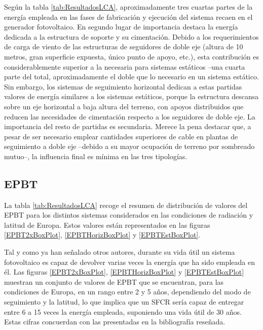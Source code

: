Según la tabla \ref{tab:ResultadosLCA}, aproximadamente tres cuartas
partes de la energía empleada en las fases de fabricación y ejecución
del sistema recaen en el generador fotovoltaico. En segundo lugar
de importancia destaca la energía dedicada a la estructura de soporte
y su cimentación. Debido a los requerimientos de carga de viento de
las estructuras de seguidores de doble eje (altura de 10 metros, gran
superficie expuesta, único punto de apoyo, etc.), esta contribución
es considerablemente superior a la necesaria para sistemas estáticos
--una cuarta parte del total, aproximadamente el doble que lo necesario
en un sistema estático. Sin embargo, los sistemas de seguimiento horizontal
dedican a estas partidas valores de energía similares a los sistemas
estáticos, porque la estructura descansa sobre un eje horizontal a
baja altura del terreno, con apoyos distribuidos que reducen las necesidades
de cimentación respecto a los seguidores de doble eje. La importancia
del resto de partidas es secundaria. Merece la pena destacar que,
a pesar de ser necesario emplear cantidades superiores de cable en
plantas de seguimiento a doble eje --debido a su mayor ocupación de
terreno por sombreado mutuo--, la influencia final es mínima en las
tres tipologías.

\subsection{EPBT}

La tabla \ref{tab:ResultadosLCA} recoge el resumen de distribución de
valores del EPBT para los distintos sistemas considerados en las
condiciones de radiación y latitud de Europa. Estos valores están
representados en las figuras \ref{EPBT2xBoxPlot},
\ref{EPBTHorizBoxPlot} y \ref{EPBTEstBoxPlot}.

Tal y como ya han señalado otros autores, durante su vida útil un
sistema fotovoltaico es capaz de devolver varias veces la energía que
ha sido empleada en él. Las figuras \ref{EPBT2xBoxPlot},
\ref{EPBTHorizBoxPlot} y \ref{EPBTEstBoxPlot} muestran un conjunto de
valores de EPBT que se encuentran, para las condiciones de Europa, en
un rango entre 2 y 5 años, dependiendo del modo de seguimiento y la
latitud, lo que implica que un SFCR sería capaz de entregar entre 6 a
15 veces la energía empleada, suponiendo una vida útil de 30
años. Estas cifras concuerdan con las presentadas en la bibliografía
reseñada.

